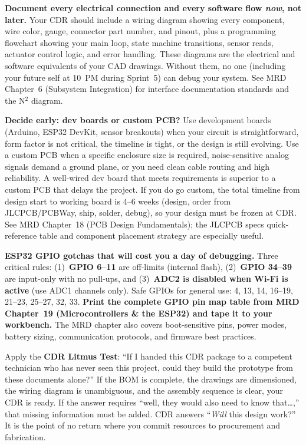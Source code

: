 \begin{tipbox}
\textbf{Document every electrical connection and every software flow \textit{now}, not later.} Your CDR should include a wiring diagram showing every component, wire color, gauge, connector part number, and pinout, plus a programming flowchart showing your main loop, state machine transitions, sensor reads, actuator control logic, and error handling. These diagrams are the electrical and software equivalents of your CAD drawings. Without them, no one (including your future self at 10~PM during Sprint~5) can debug your system. See MRD Chapter~6 (Subsystem Integration) for interface documentation standards and the N$^2$ diagram.
\end{tipbox}

\begin{protip}
\textbf{Decide early: dev boards or custom PCB?} Use development boards (Arduino, ESP32 DevKit, sensor breakouts) when your circuit is straightforward, form factor is not critical, the timeline is tight, or the design is still evolving. Use a custom PCB when a specific enclosure size is required, noise-sensitive analog signals demand a ground plane, or you need clean cable routing and high reliability. A well-wired dev board that meets requirements is superior to a custom PCB that delays the project. If you do go custom, the total timeline from design start to working board is 4--6 weeks (design, order from JLCPCB/PCBWay, ship, solder, debug), so your design must be frozen at CDR. See MRD Chapter~18 (PCB Design Fundamentals); the JLCPCB specs quick-reference table and component placement strategy are especially useful.
\end{protip}

\begin{warnbox}
\textbf{ESP32 GPIO gotchas that will cost you a day of debugging.} Three critical rules: (1)~\textbf{GPIO 6--11} are off-limits (internal flash), (2)~\textbf{GPIO 34--39} are input-only with no pull-ups, and (3)~\textbf{ADC2 is disabled when Wi-Fi is active} (use ADC1 channels only). Safe GPIOs for general use: 4, 13, 14, 16--19, 21--23, 25--27, 32, 33. \textbf{Print the complete GPIO pin map table from MRD Chapter~19 (Microcontrollers \& the ESP32) and tape it to your workbench.} The MRD chapter also covers boot-sensitive pins, power modes, battery sizing, communication protocols, and firmware best practices.
\end{warnbox}

\begin{faqbox}
Apply the \textbf{CDR Litmus Test}: ``If I handed this CDR package to a competent technician who has never seen this project, could they build the prototype from these documents alone?'' If the BOM is complete, the drawings are dimensioned, the wiring diagram is unambiguous, and the assembly sequence is clear, your CDR is ready. If the answer requires ``well, they would also need to know that\ldots,'' that missing information must be added. CDR answers ``\textit{Will} this design work?'' It is the point of no return where you commit resources to procurement and fabrication.
\end{faqbox}

